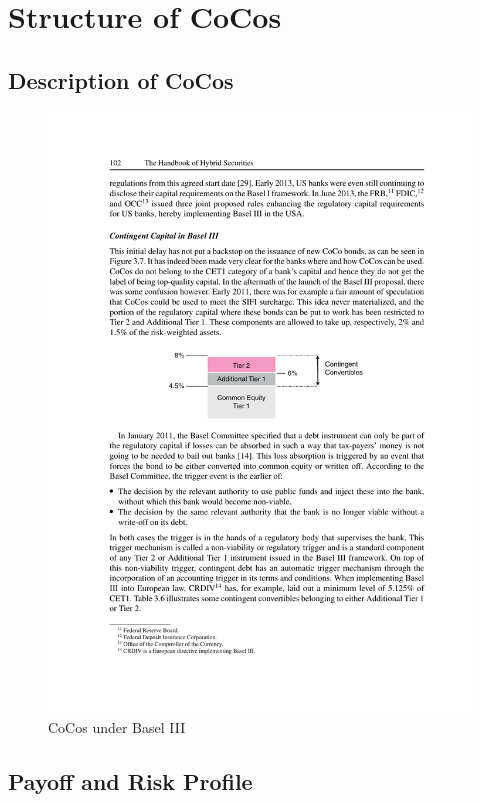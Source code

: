 \chapter{Structure of CoCos}

\section{Description of CoCos}

\begin{figure}[ht]
	\centering
	\includegraphics[trim=0.1cm 0.1cm 0.2cm 0.1cm, scale = 1]{media/basel3} \par
	\caption[CoCos under Basel III]{CoCos under Basel III \citep{de2014handbook}}
\end{figure}

\section{Payoff and Risk Profile}

